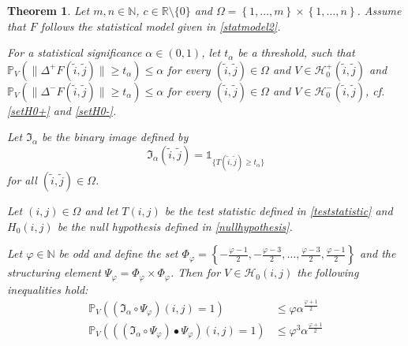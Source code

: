 \documentclass[a4paper,12pt]{article}
\newcommand{\norm}[1]{\lVert#1\rVert}
\theoremstyle{plain}
\newtheorem{theorem}{Theorem}[section]
\theoremstyle{definition}
\begin{document}
\begin{theorem}\label{thm: typeIinequalities}
	Let $m, n \in \mathbb{N}$, $c \in \mathbb{R} \setminus \{ 0 \}$ and $\Omega = \left\{ 1, \dots, m \right\} \times \left\{ 1, \dots, n \right\}$. Assume that $F$ follows the statistical model given in \eqref{statmodel2}.
	
	For a statistical significance $\alpha \in (0, 1)$, let $t_\alpha$ be a threshold, such that $\mathbb{P}_V( \norm{\Delta^+ F(\tilde{i}, \tilde{j})} \geq t_\alpha ) \leq \alpha$ for every $(\tilde{i}, \tilde{j}) \in \Omega$ and $V \in \mathcal{H}_0^+(\tilde{i}, \tilde{j})$ and $\mathbb{P}_V( \norm{\Delta^- F(\tilde{i}, \tilde{j})} \geq t_\alpha ) \leq \alpha$ for every $(\tilde{i}, \tilde{j}) \in \Omega$ and $V \in \mathcal{H}_0^-(\tilde{i}, \tilde{j})$, cf. \eqref{setH0+} and \eqref{setH0-}.
	
	Let $\mathfrak{I}_\alpha$ be the binary image defined by
	\begin{equation*}
		\mathfrak{I}_\alpha(\tilde{i}, \tilde{j}) = \mathds{1}_{ \{ T(\tilde{i}, \tilde{j}) \geq t_\alpha \} }
	\end{equation*}
	for all $(\tilde{i}, \tilde{j}) \in \Omega$.
	
	Let $(i, j) \in \Omega$ and let $T(i, j)$ be the test statistic defined in \eqref{teststatistic} and $H_0(i, j)$ be the null hypothesis defined in \eqref{nullhypothesis}.
	
	Let $\varphi \in \mathbb{N}$ be odd and define the set $\Phi_\varphi = \left\{ -\frac{\varphi - 1}{2}, -\frac{\varphi - 3}{2}, \dots, \frac{\varphi - 3}{2}, \frac{\varphi - 1}{2} \right\}$ and the structuring element $\Psi_\varphi = \Phi_\varphi \times \Phi_\varphi$.
	Then for $V \in \mathcal{H}_0(i, j)$ the following inequalities hold:
	\begin{align}
		\mathbb{P}_V\left( (\mathfrak{I}_\alpha \circ \Psi_\varphi)(i, j) = 1 \right) &\leq \varphi \alpha^{\frac{\varphi + 1}{2}} \label{ineq: typeIopening} \\
		\mathbb{P}_V\left( ((\mathfrak{I}_\alpha \circ \Psi_\varphi) \bullet \Psi_\varphi)(i, j) = 1 \right) &\leq \varphi^3 \alpha^{\frac{\varphi + 1}{2}} \label{ineq: typeIclosing}
	\end{align}
\end{theorem}
\end{document}
